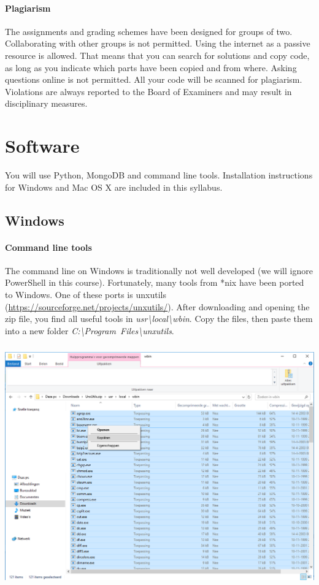 \documentclass[a4paper]{report}
\begin{document}
\paragraph{Plagiarism}
The assignments and grading schemes have been designed for groups of two. Collaborating with other groups is not permitted. Using the internet as a passive resource is allowed. That means that you can search for solutions and copy code, as long as you indicate which parts have been copied and from where. Asking questions online is not permitted. All your code will be scanned for plagiarism. Violations are always reported to the Board of Examiners and may result in disciplinary measures.

\section*{Software}
You will use Python, MongoDB and command line tools. Installation instructions for Windows and Mac OS X are included in this syllabus.

\subsection*{Windows}
\paragraph{Command line tools}
The command line on Windows is traditionally not well developed (we will
ignore PowerShell in this course). Fortunately, many tools from *nix
have been ported to Windows. One of these ports is \mbox{unxutils}
(\url{https://sourceforge.net/projects/unxutils/}). After downloading
and opening the zip file, you find all useful tools in
\textit{usr{\textbackslash}local{\textbackslash}wbin}. Copy the files,
then paste them into a new folder \textit{C:{\textbackslash}Program~Files{\textbackslash}unxutils}.

\noindent\begin{center}\includegraphics[width=5.552in,height=4.098in]{Syllabus-img1.png}\end{center}
\end{document}
